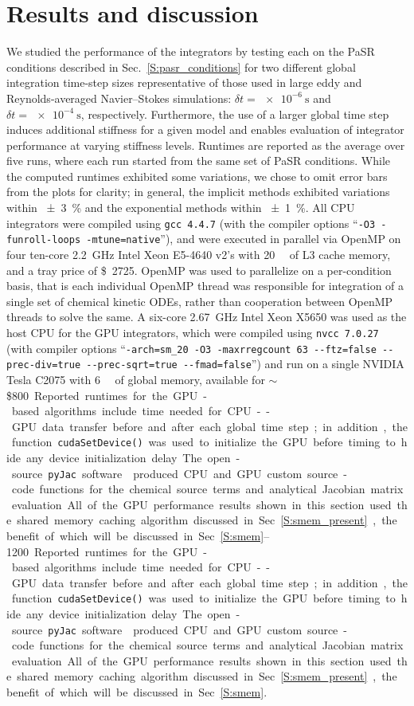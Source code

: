 \documentclass[final,twocolumn]{elsarticle}
\begin{document}
\section{Results and discussion}
\label{S:results}
\ifmeasure
\addvspace{10pt}
\fi

We studied the performance of the integrators by testing each on the PaSR conditions described in Sec.~\ref{S:pasr_conditions} for two different global integration time-step sizes representative of those used in large eddy and Reynolds-averaged Navier--Stokes simulations: $\delta t = \SI{e-6}{\s}$ and $\delta t = \SI{e-4}{\s}$, respectively.
Furthermore, the use of a larger global time step induces additional stiffness for a given model and enables evaluation of integrator performance at varying stiffness levels.
Runtimes are reported as the average over five runs, where each run started from the same set of PaSR conditions.
While the computed runtimes exhibited some variations, we chose to omit error bars from the plots for clarity; in general, the implicit methods exhibited variations within \SI{\pm3}{\percent} and the exponential methods within \SI{\pm1}{\percent}.
All CPU integrators were compiled using \texttt{gcc 4.4.7} (with the compiler options ``\texttt{-O3 -funroll-loops -mtune=native}''), and were executed in parallel via OpenMP on four ten-core \SI{2.2}{\giga\hertz} Intel Xeon E5-4640 v2's with \SI{20}{\mega\byte} of L3 cache memory, and a tray price of \SI{2725}[\$]{}.
OpenMP was used to parallelize on a per-condition basis, that is each individual OpenMP thread was responsible for integration of a single set of chemical kinetic ODEs, rather than cooperation between OpenMP threads to solve the same.
A six-core \SI{2.67}{\giga\hertz} Intel Xeon X5650 was used as the host CPU for the GPU integrators, which were compiled using \texttt{nvcc 7.0.27} (with compiler options ``\texttt{-arch=sm\_20 -O3 -maxrregcount 63 -{}-ftz=false -{}-prec-div=true -{}-prec-sqrt=true -{}-fmad=false}'') and run on a single NVIDIA Tesla C2075 with \SI{6}{\giga\byte} of global memory, available for $\sim$\$\SIrange{800}{1200}.
Reported runtimes for the GPU-based algorithms include time needed for CPU--GPU data transfer before and after each global time step; in addition, the function \texttt{cudaSetDevice()} was used to initialize the GPU before timing to hide any device initialization delay.
The open-source \texttt{pyJac} software~\cite{Niemeyer:2015im,Niemeyer:2015ws} produced CPU and GPU custom source-code functions for the chemical source terms and analytical Jacobian matrix evaluation.
All of the GPU performance results shown in this section used the shared memory caching algorithm discussed in Sec.~\ref{S:smem_present}, the benefit of which will be discussed in Sec.~\ref{S:smem}.
\end{document}
